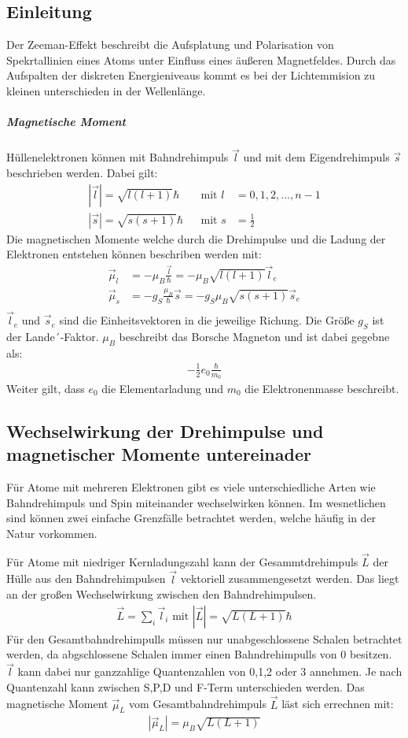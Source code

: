 \subsection{Einleitung}
Der Zeeman-Effekt beschreibt die Aufsplatung und Polarisation von Spekrtallinien eines Atoms unter Einfluss eines äußeren Magnetfeldes.
Durch das Aufspalten der diskreten Energieniveaus kommt es bei der Lichtemmision zu kleinen unterschieden in der Wellenlänge.

\subparagraph{Magnetische Moment}
Hüllenelektronen können mit Bahndrehimpuls $\vec{l}$ und mit dem Eigendrehimpuls $\vec{s}$ beschrieben werden.
Dabei gilt:
\begin{align*}
  |\vec{l}|=\sqrt{l(l+1)}\hbar&& \text{mit } l &= 0,1,2,...,n-1\\
  |\vec{s}|=\sqrt{s(s+1)}\hbar&& \text{mit } s &= \frac{1}{2}
\end{align*}
Die magnetischen Momente welche durch die Drehimpulse und die Ladung der Elektronen entstehen können beschriben werden mit:
\begin{align*}
  \vec{\mu}_l &= -\mu_B \frac{\vec{l}}{\hbar} = -\mu_B \sqrt{l(l+1)}\vec{l}_e\\
  \vec{\mu}_s &= -g_S \frac{\mu_B}{\hbar}\vec{s} = -g_S \mu_B \sqrt{s(s+1)}\vec{s}_e\\
\end{align*}
$\vec{l}_e$ und $\vec{s}_e$ sind die Einheitsvektoren in die jeweilige Richung.
Die Größe $g_S$ ist der Lande´-Faktor. $\mu_B$ beschreibt das Borsche Magneton und ist dabei gegebne als:
\begin{align*}
  -\frac{1}{2} e_0 \frac{\hbar}{m_0}
\end{align*}
Weiter gilt, dass $e_0$ die Elementarladung und $m_0$ die Elektronenmasse beschreibt.

\subsection{Wechselwirkung der Drehimpulse und magnetischer Momente untereinader}
Für Atome mit mehreren Elektronen gibt es viele unterschiedliche Arten wie Bahndrehimpuls und Spin miteinander wechselwirken können.
Im wesnetlichen sind können zwei einfache Grenzfälle betrachtet werden, welche häufig in der Natur vorkommen.

Für Atome mit niedriger Kernladungszahl kann der Gesammtdrehimpuls $\vec{L}$ der Hülle aus den Bahndrehimpulsen $\vec{l}$ vektoriell zusammengesetzt werden.
Das liegt an der großen Wechselwirkung zwischen den Bahndrehimpulsen.
\begin{align*}
  \vec{L} = \sum_i{\vec{l}_i} \text{ mit } |\vec{L}|= \sqrt{L(L+1)}\hbar
\end{align*}
Für den Gesamtbahndrehimpulls müssen nur unabgeschlossene Schalen betrachtet werden, da abgschlossene Schalen immer einen Bahndrehimpulls von 0 besitzen.
$\vec{l}$ kann dabei nur ganzzahlige Quantenzahlen von 0,1,2 oder 3 annehmen.
Je nach Quantenzahl kann zwischen S,P,D und F-Term unterschieden werden.
Das magnetische Moment $\vec{\mu}_L$ vom Gesamtbahndrehimpuls $\vec{L}$ läst sich errechnen mit:
\begin{align*}
  |\vec{\mu}_L| = \mu_B\sqrt{L(L+1)}
\end{align*}


